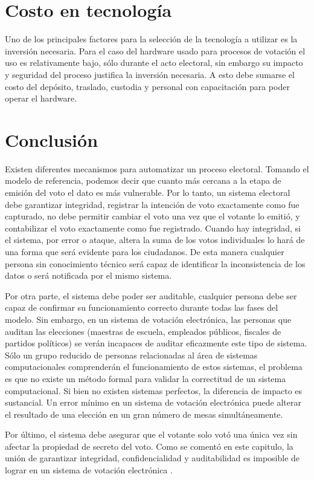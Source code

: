 \section{Costo en tecnología}

Uno de los principales factores para la selección de la tecnología a utilizar es la inversión necesaria. Para el caso del hardware usado para procesos de votación el uso es relativamente bajo, sólo durante el acto electoral, sin embargo su impacto y seguridad del proceso justifica la inversión necesaria. A esto debe sumarse el costo del depósito, traslado, custodia y personal con capacitación para poder operar el hardware.

\section{Conclusión}

Existen diferentes mecanismos para automatizar un proceso electoral. Tomando el modelo de referencia, podemos decir que cuanto más cercana a la etapa de emisión del voto el dato es más vulnerable. Por lo tanto, un sistema electoral debe garantizar integridad, registrar la intención de voto exactamente como fue capturado, no debe permitir cambiar el voto una vez que el votante lo emitió, y contabilizar el voto exactamente como fue registrado. Cuando hay integridad, si el sistema, por error o ataque, altera la suma de los votos individuales lo hará de una forma que será evidente para los ciudadanos. De esta manera cualquier persona sin conocimiento técnico será capaz de identificar la inconsistencia de los datos o será notificada por el mismo sistema.

Por otra parte, el sistema debe poder ser auditable, cualquier persona debe ser capaz de confirmar su funcionamiento correcto durante todas las fases del modelo. Sin embargo, en un sistema de votación electrónica, las personas que auditan las elecciones (maestras de escuela, empleados públicos, fiscales de partidos políticos) se verán incapaces de auditar eficazmente este tipo de sistema. Sólo un grupo reducido de personas relacionadas al área de sistemas computacionales comprenderán el funcionamiento de estos sistemas, el problema es que no existe un método formal para validar la correctitud de un sistema computacional. Si bien no existen sistemas perfectos, la diferencia de impacto es sustancial. Un error mínimo en un sistema de votación electrónica puede alterar el resultado de una elección en un gran número de mesas simultáneamente. 

Por último, el sistema debe asegurar que el votante solo votó una única vez sin afectar la propiedad de secreto del voto. Como se comentó en este capitulo, la unión de garantizar integridad, confidencialidad y auditabilidad es imposible de lograr en un sistema de votación electrónica \cite{vora}. 
